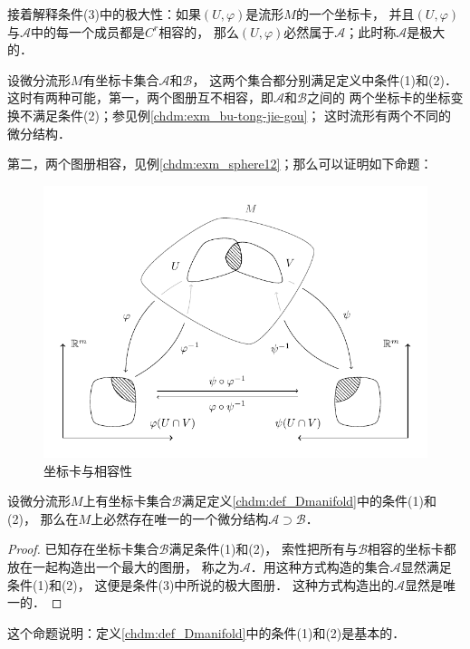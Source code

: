 接着解释条件(3)中的极大性：如果$(U,\varphi)$是流形$M$的一个坐标卡，
并且$(U,\varphi)$与$\mathscr{A}$中的每一个成员都是$C^r$相容的，
那么$(U,\varphi)$必然属于$\mathscr{A}$；此时称$\mathscr{A}$是极大的．

设微分流形$M$有坐标卡集合$\mathscr{A}$和$\mathscr{B}$，
这两个集合都分别满足定义中条件(1)和(2)．
这时有两种可能，第一，两个图册互不相容，即$\mathscr{A}$和$\mathscr{B}$之间的
两个坐标卡的坐标变换不满足条件(2)；参见例\ref{chdm:exm_bu-tong-jie-gou}；
这时流形有两个不同的微分结构．

第二，两个图册相容，见例\ref{chdm:exm_sphere12}；那么可以证明如下命题：

\begin{figure}[htb]
    \centering
    \includegraphics{fig/ch4-atlas-chart.pdf}
    \caption{坐标卡与相容性}\label{chdm:pic_chart}
\end{figure}


\begin{proposition}\label{chdm:thm_biggestDiffStruc}
    设微分流形$M$上有坐标卡集合$\mathscr{B}$满足定义\ref{chdm:def_Dmanifold}中的条件(1)和(2)，
    那么在$M$上必然存在唯一的一个微分结构$\mathscr{A}\supset \mathscr{B}$．
\end{proposition}
\begin{proof}
    已知存在坐标卡集合$\mathscr{B}$满足条件(1)和(2)，
    索性把所有与$\mathscr{B}$相容的坐标卡都放在一起构造出一个最大的图册，
    称之为$\mathscr{A}$．用这种方式构造的集合$\mathscr{A}$显然满足条件(1)和(2)，
    这便是条件(3)中所说的极大图册．
    这种方式构造出的$\mathscr{A}$显然是唯一的．
\end{proof}
这个命题说明：定义\ref{chdm:def_Dmanifold}中的条件(1)和(2)是基本的．


